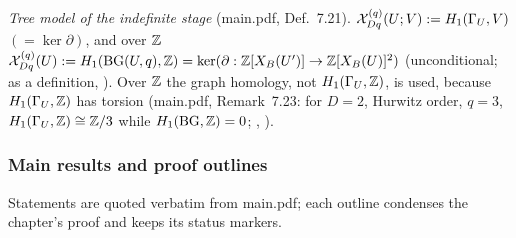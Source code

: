 \emph{Tree model of the indefinite stage} (main.pdf, Def.~7.21). $\mathcal{X}^{(q)}_{Dq}(U;V):=H_1(\Gamma_U,V)$ $(=\ker\partial)$, and over $\mathbb{Z}$
$\mathcal{X}^{(q)}_{Dq}(U):=H_1(\mathrm{BG}(U,q),\mathbb{Z})=\ker(\partial:\mathbb{Z}[X_B(U')]\to\mathbb{Z}[X_B(U)]^2)$ (unconditional; \stformal{} as a definition,
). Over $\mathbb{Z}$ the graph homology, not $H_1(\Gamma_U,\mathbb{Z})$, is used, because $H_1(\Gamma_U,\mathbb{Z})$ has torsion
(main.pdf, Remark~7.23: for $D=2$, Hurwitz order, $q=3$, $H_1(\Gamma_U,\mathbb{Z})\cong\mathbb{Z}/3$ while $H_1(\mathrm{BG},\mathbb{Z})=0$; \stcomp, ).

\subsubsection*{Main results and proof outlines}
\begingroup\sloppy
Statements are quoted verbatim from main.pdf; each outline condenses the chapter's proof and keeps its status markers.

